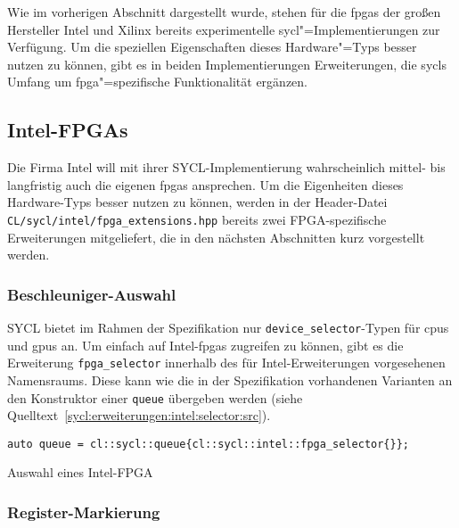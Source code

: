 Wie im vorherigen Abschnitt dargestellt wurde, stehen für die \gls{fpga}s der
großen Hersteller Intel und Xilinx bereits experimentelle
\gls{sycl}"=Implementierungen zur Verfügung. Um die speziellen Eigenschaften
dieses Hardware"=Typs besser nutzen zu können, gibt es in beiden
Implementierungen Erweiterungen, die \gls{sycl}s Umfang um
\gls{fpga}"=spezifische Funktionalität ergänzen.

\subsection{Intel-FPGAs}\label{sycl:erweiterungen:intel}

Die Firma Intel will mit ihrer SYCL-Implementierung wahrscheinlich mittel- bis
langfristig auch die eigenen \glspl{fpga} ansprechen. Um die Eigenheiten dieses
Hardware-Typs besser nutzen zu können, werden in der Header-Datei
\texttt{CL/sycl/intel/fpga\_extensions.hpp} bereits zwei FPGA-spezifische
Erweiterungen mitgeliefert, die in den nächsten Abschnitten kurz vorgestellt
werden.

\subsubsection{Beschleuniger-Auswahl}\label{sycl:erweiterungen:intel:selector}

SYCL bietet im Rahmen der Spezifikation nur \texttt{device\_selector}-Typen
für \gls{cpu}s und \gls{gpu}s an. Um einfach auf Intel-\gls{fpga}s zugreifen
zu können, gibt es die Erweiterung \texttt{fpga\_selector} innerhalb des
für Intel-Erweiterungen vorgesehenen Namensraums. Diese kann wie die in der
Spezifikation vorhandenen Varianten an den Konstruktor einer \texttt{queue}
übergeben werden (siehe Quelltext~\ref{sycl:erweiterungen:intel:selector:src}).

\begin{code}
    \begin{verbatim}
auto queue = cl::sycl::queue{cl::sycl::intel::fpga_selector{}};
    \end{verbatim}
    \caption{Auswahl eines Intel-FPGA}
    \label{sycl:erweiterungen:intel:selector:src}
\end{code}

\subsubsection{Register-Markierung}\label{sycl:erweiterungen:intel:register}

